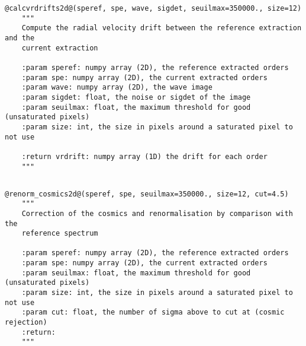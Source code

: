 \begin{lstlisting}[style=pythonstyle]
@calcvrdrifts2d@(speref, spe, wave, sigdet, seuilmax=350000., size=12)
    """
    Compute the radial velocity drift between the reference extraction and the
    current extraction
    
    :param speref: numpy array (2D), the reference extracted orders
    :param spe: numpy array (2D), the current extracted orders
    :param wave: numpy array (2D), the wave image
    :param sigdet: float, the noise or sigdet of the image
    :param seuilmax: float, the maximum threshold for good (unsaturated pixels)
    :param size: int, the size in pixels around a saturated pixel to not use
    
    :return vrdrift: numpy array (1D) the drift for each order 
    """
\end{lstlisting}

\vspace{0.5cm}
\subsection{}

\begin{lstlisting}[style=pythonstyle]
@renorm_cosmics2d@(speref, spe, seuilmax=350000., size=12, cut=4.5)
    """
    Correction of the cosmics and renormalisation by comparison with the 
    reference spectrum
    
    :param speref: numpy array (2D), the reference extracted orders
    :param spe: numpy array (2D), the current extracted orders
    :param seuilmax: float, the maximum threshold for good (unsaturated pixels)
    :param size: int, the size in pixels around a saturated pixel to not use
    :param cut: float, the number of sigma above to cut at (cosmic rejection)
    :return:
    """
\end{lstlisting}
